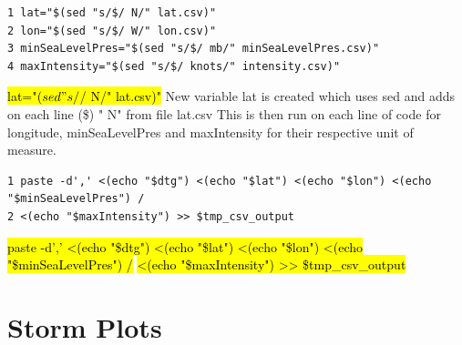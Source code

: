 \documentclass[]{article}
\begin{document}
\begin{tcolorbox}[colback=white, colframe=black, boxrule=0.5pt, arc=2mm, 
    title=Third part of the code, fonttitle=\bfseries, listing only, listing options={language=sh, basicstyle=\ttfamily}]
    \begin{verbatim}
1 lat="$(sed "s/$/ N/" lat.csv)"
2 lon="$(sed "s/$/ W/" lon.csv)"
3 minSeaLevelPres="$(sed "s/$/ mb/" minSeaLevelPres.csv)"
4 maxIntensity="$(sed "s/$/ knots/" intensity.csv)"
    \end{verbatim}
    \hl{lat="$(sed "s/$/ N/" lat.csv)"}\newline
    New variable lat is created which uses sed and adds on each line (\$) " N" from file lat.csv\newline
    This is then run on each line of code for longitude, minSeaLevelPres and maxIntensity for their\newline
    respective unit of measure.\newline
\end{tcolorbox}
\begin{tcolorbox}[colback=white, colframe=black, boxrule=0.5pt, arc=2mm, 
    title=Fourth part of the code, fonttitle=\bfseries, listing only, listing options={language=sh, basicstyle=\ttfamily}]
    \begin{verbatim}
1 paste -d',' <(echo "$dtg") <(echo "$lat") <(echo "$lon") <(echo "$minSeaLevelPres") /
2 <(echo "$maxIntensity") >> $tmp_csv_output
    \end{verbatim}
\hl{paste -d',' <(echo "\$dtg") <(echo "\$lat") <(echo "\$lon") <(echo "\$minSeaLevelPres") /}\newline
\hl{<(echo "\$maxIntensity") >> \$tmp\_csv\_output}

\end{tcolorbox}
\clearpage



\section{Storm Plots}
\end{document}
